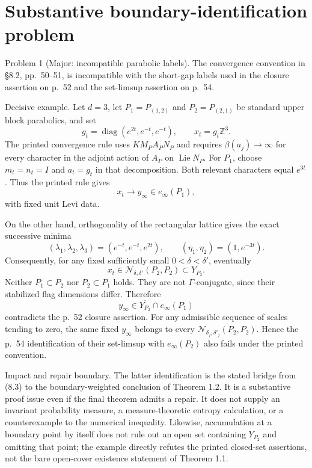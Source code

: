 \documentclass[10pt]{article}
\begin{document}
\section*{Substantive boundary-identification problem}
Problem 1 (Major: incompatible parabolic labels).  The convergence convention in §8.2, pp. 50–51, is incompatible with the short-gap labels used in the closure assertion on p. 52 and the set-limsup assertion on p. 54.\par
Decisive example. Let \(d=3\), let \(P_1=P_{(1,2)}\) and \(P_2=P_{(2,1)}\) be standard upper block parabolics, and set \[g_t=\operatorname{diag}(e^{2t},e^{-t},e^{-t}),\qquad x_t=g_t\mathbb Z^3.\] The printed convergence rule uses \(K M_P A_P N_P\) and requires \(\beta(a_j)\to\infty\) for every character in the adjoint action of \(A_P\) on \(\operatorname{Lie}N_P\). For \(P_1\), choose \(m_t=n_t=I\) and \(a_t=g_t\) in that decomposition. Both relevant characters equal \(e^{3t}\). Thus the printed rule gives \[x_t\longrightarrow y_\infty\in e_\infty(P_1),\] with fixed unit Levi data.\par
On the other hand, orthogonality of the rectangular lattice gives the exact successive minima \[(\lambda_1,\lambda_2,\lambda_3)
       =(e^{-t},e^{-t},e^{2t}),\qquad
 (\eta_1,\eta_2)=(1,e^{-3t}).\] Consequently, for any fixed sufficiently small \(0<\delta<\delta'\), eventually \[x_t\in\mathcal N_{\delta,\delta'}(P_2,P_2)\subset Y_{P_2}.\] Neither \(P_1\subset P_2\) nor \(P_2\subset P_1\) holds. They are not \(\Gamma\)-conjugate, since their stabilized flag dimensions differ. Therefore \[y_\infty\in\overline{Y_{P_2}}\cap e_\infty(P_1)\] contradicts the p. 52 closure assertion. For any admissible sequence of scales tending to zero, the same fixed \(y_\infty\) belongs to every \(\overline{\mathcal N_{\delta_j,\delta'_j}(P_2,P_2)}\). Hence the p. 54 identification of their set-limsup with \(e_\infty(P_2)\) also fails under the printed convention.\par
Impact and repair boundary. The latter identification is the stated bridge from (8.3) to the boundary-weighted conclusion of Theorem 1.2. It is a substantive proof issue even if the final theorem admits a repair. It does not supply an invariant probability measure, a measure-theoretic entropy calculation, or a counterexample to the numerical inequality. Likewise, accumulation at a boundary point by itself does not rule out an open set containing \(Y_{P_2}\) and omitting that point; the example directly refutes the printed closed-set assertions, not the bare open-cover existence statement of Theorem 1.1.\par
\end{document}
